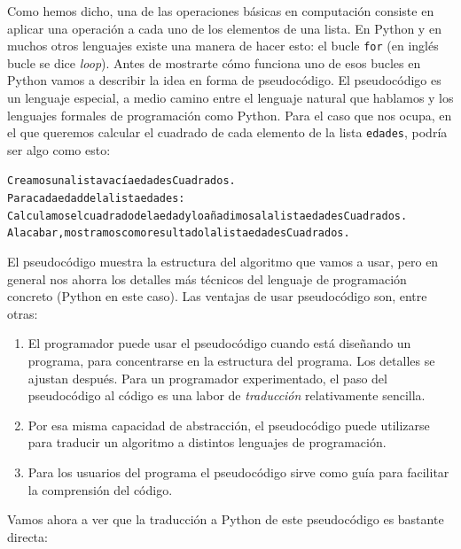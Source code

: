 \documentclass[10pt,a4paper]{article}\usepackage[]{graphicx}\usepackage[]{color}
\makeatletter
\newenvironment{kframe}{%
 \def\at@end@of@kframe{}%
 \ifinner\ifhmode%
  \def\at@end@of@kframe{\end{minipage}}%
  \begin{minipage}{\columnwidth}%
 \fi\fi%
 \def\FrameCommand##1{\hskip\@totalleftmargin \hskip-\fboxsep
 \colorbox{shadecolor}{##1}\hskip-\fboxsep
     \hskip-\linewidth \hskip-\@totalleftmargin \hskip\columnwidth}%
 \MakeFramed {\advance\hsize-\width
   \@totalleftmargin\z@ \linewidth\hsize
   \@setminipage}}%
 {\par\unskip\endMakeFramed%
 \at@end@of@kframe}
\newenvironment{knitrout}{}{} %
\makeatother
\begin{document}
Como hemos dicho, una de las operaciones básicas en computación consiste en aplicar una operación a cada uno de los elementos de una lista. En Python y en muchos otros lenguajes existe una manera de hacer esto: el bucle {\tt for} (en inglés bucle se dice {\em loop}). Antes de mostrarte cómo funciona uno de esos bucles en Python vamos a describir la idea en forma de {\sf pseudocódigo}. El pseudocódigo es un lenguaje especial, a medio camino entre el lenguaje natural que hablamos y los lenguajes formales de programación como Python. Para el caso que nos ocupa, en el que queremos calcular el cuadrado de cada elemento de la lista {\tt edades}, podría ser algo como esto:
\begin{knitrout}
\color{fgcolor}\begin{kframe}
\begin{alltt}
Creamos una lista vacía edadesCuadrados.
Para cada edad de la lista edades:
    Calculamos el cuadrado de la edad y lo añadimos a la lista edadesCuadrados.
Al acabar, mostramos como resultado la lista edadesCuadrados.
\end{alltt}
\end{kframe}
\end{knitrout}
El pseudocódigo muestra la estructura del algoritmo que vamos a usar, pero en general nos ahorra los detalles más técnicos del lenguaje de programación concreto (Python en este caso). Las ventajas de usar pseudocódigo son, entre otras:
\begin{enumerate}
  \item  El programador puede usar el pseudocódigo cuando está diseñando un programa, para concentrarse en la estructura del programa. Los detalles se ajustan después. Para un programador experimentado, el paso del pseudocódigo al código es una labor de {\em traducción} relativamente sencilla.
  \item Por esa misma capacidad de abstracción, el pseudocódigo puede utilizarse para traducir un algoritmo a distintos lenguajes de programación.
  \item Para los usuarios del programa el pseudocódigo sirve como guía para facilitar la comprensión del código.

\end{enumerate}

Vamos ahora a ver que la traducción a Python de este pseudocódigo es bastante directa:
\end{document}
